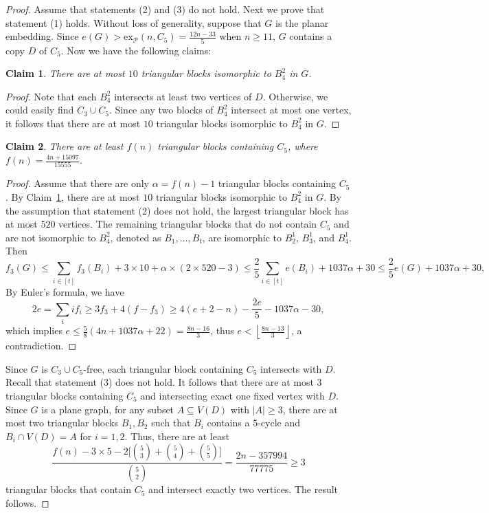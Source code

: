 \documentclass[12pt]{article}
\newtheorem{claim}{Claim}[section]
\newcommand{\ex}{\mathrm{ex}}
\begin{document}
\begin{proof}
    Assume that statements (2) and (3) do not hold. Next we prove that statement (1) holds. Without loss of generality, suppose that $G$ is the planar embedding.
    Since $e(G)>\ex_{\mathcal{P}}(n,C_5)=\frac{12n-33}{5}$ when $n\geq 11$, $G$ contains a copy $D$ of $C_5$. Now we have the following claims:
    
    \begin{claim}\label{claim1}
        There are at most $10$ triangular blocks isomorphic to $B_4^2$ in $G$.
    \end{claim}
    \begin{proof}
        Note that each $B_4^2$ intersects at least two vertices of $D$. Otherwise, we could easily find $C_3\cup C_5$. Since any two blocks of $B_4^2$ intersect at most one vertex, it follows that there are at most $10$ triangular blocks isomorphic to $B_4^2$ in $G$.
    \end{proof}
    
    \begin{claim}\label{claim2}
        There are at least $f(n)$ triangular blocks containing $C_5$, where $f(n)=\frac{4n+15097}{15555}$.
    \end{claim}
    \begin{proof}
        Assume that there are only $\alpha=f(n)-1$ triangular blocks containing $C_5$. By Claim~\ref{claim1}, there are at most $10$ triangular blocks isomorphic to $B_4^2$ in $G$. By the assumption that statement (2) does not hold, the largest triangular block has at most $520$ vertices. The remaining triangular blocks that do not contain $C_5$ and are not isomorphic to $B_4^2$, denoted as $B_1,\ldots,B_t$, are isomorphic to $B_2^1$, $B_3^1$, and $B_4^1$. Then
        $$f_3(G) \leq \sum_{i\in[t]}f_3(B_i)+3\times10+\alpha\times (2\times 520-3) \leq \frac{2}{5}\sum_{i\in [t]}e(B_i)+1037\alpha+30 \leq \frac{2}{5}e(G)+1037\alpha+30,$$
        By Euler's formula, we have
        $$2e = \sum_{i}if_i \geq 3f_3+4(f-f_3) \geq 4(e+2-n)-\frac{2e}{5}-1037\alpha-30,$$
        which implies $e \leq \frac{5}{8}(4n+1037\alpha+22)=\frac{8n-16}{3}$, thus $e<\left\lfloor\frac{8n-13}{3}\right\rfloor$, a contradiction.   
    \end{proof}
    Since $G$ is $C_3\cup C_5$-free, each triangular block containing $C_5$ intersects with $D$.
    Recall that statement (3) does not hold. It follows that there are at most $3$ triangular blocks containing $C_5$ and intersecting exact one fixed vertex with $D$. Since $G$ is a plane graph, for any subset $A\subseteq V(D)$ with $|A|\geq 3$, there are at most two triangular blocks $B_1,B_2$ such that $B_i$ contains a $5$-cycle and $B_i\cap V(D)=A$ for $i=1,2$. Thus, there are at least 
    $$\frac{f(n)-3\times 5-2\big[\binom{5}{3}+\binom{5}{4}+\binom{5}{5}\big]}{\binom{5}{2}}=\frac{2n-357994}{77775}\geq 3$$ 
    triangular blocks that contain $C_5$ and intersect exactly two vertices. The result follows.
\end{proof}
\end{document}
